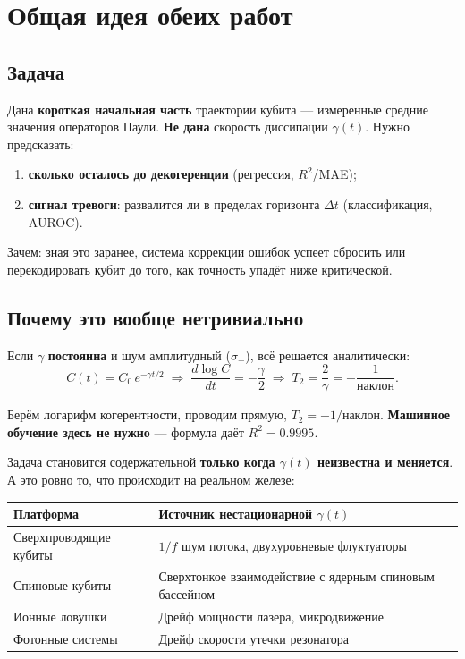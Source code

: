 \documentclass[12pt,a4paper]{article}
\begin{document}
\section{Общая идея обеих работ}

\subsection{Задача}

Дана \textbf{короткая начальная часть} траектории кубита — измеренные средние
значения операторов Паули. \textbf{Не дана} скорость диссипации $\gamma(t)$.
Нужно предсказать:

\begin{enumerate}
  \item \textbf{сколько осталось до декогеренции} (регрессия, $R^2$/MAE);
  \item \textbf{сигнал тревоги}: развалится ли в пределах горизонта $\Delta t$
        (классификация, AUROC).
\end{enumerate}

Зачем: зная это заранее, система коррекции ошибок успеет сбросить или
перекодировать кубит до того, как точность упадёт ниже критической.

\subsection{Почему это вообще нетривиально}

Если $\gamma$ \textbf{постоянна} и шум амплитудный ($\sigma_-$), всё решается
аналитически:
\begin{equation}
  C(t)=C_0\,e^{-\gamma t/2}
  \;\Longrightarrow\;
  \frac{d\log C}{dt}=-\frac{\gamma}{2}
  \;\Longrightarrow\;
  T_2=\frac{2}{\gamma}=-\frac{1}{\text{наклон}}.
  \label{eq:ols}
\end{equation}

Берём логарифм когерентности, проводим прямую, $T_2=-1/\text{наклон}$.
\textbf{Машинное обучение здесь не нужно} — формула даёт $R^2=0.9995$.

Задача становится содержательной \textbf{только когда $\gamma(t)$ неизвестна и
меняется}. А это ровно то, что происходит на реальном железе:

\begin{center}
\small
\begin{tabular}{@{}lp{9.2cm}@{}}
\toprule
Платформа & Источник нестационарной $\gamma(t)$ \\
\midrule
Сверхпроводящие кубиты & $1/f$ шум потока, двухуровневые флуктуаторы \\
Спиновые кубиты & Сверхтонкое взаимодействие с ядерным спиновым бассейном \\
Ионные ловушки & Дрейф мощности лазера, микродвижение \\
Фотонные системы & Дрейф скорости утечки резонатора \\
\bottomrule
\end{tabular}
\end{center}
\end{document}
